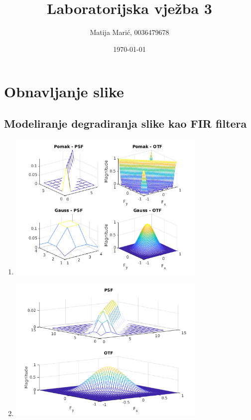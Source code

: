 \documentclass[12pt, a4]{report}
\title{Laboratorijska vježba 3}
\author{Matija Marić, 0036479678}
\date{\today}
\begin{document}
\begin{titlepage}
	\maketitle
\end{titlepage}

\tableofcontents{}

\chapter{Obnavljanje slike}
\section{Modeliranje degradiranja slike kao FIR filtera}
\begin{enumerate}
	\item
	      \begin{minipage}{\linewidth}
		      \centering
		      \includegraphics[width=0.75\textwidth]{zad01}
	      \end{minipage}
	\item
	      \begin{minipage}{\linewidth}
		      \centering
		      \includegraphics[width=0.75\textwidth]{zamcomb}

\end{minipage}
\end{enumerate}
\end{document}
